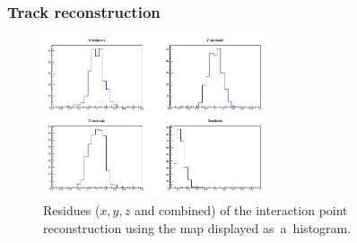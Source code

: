 \documentclass{beamer}
\begin{document}
	\begin{frame}
		\frametitle{Track reconstruction}
		\begin{figure}
			\centering
			\includegraphics[width=0.6\textwidth]{images/residues_hist.png}
			\caption{Residues ($x,y,z$ and combined) of the interaction point reconstruction using the map displayed as~a~histogram.}
		\end{figure}
	\end{frame}
	
\end{document}
